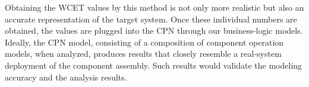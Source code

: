 Obtaining the WCET values by this method is not only more realistic but also an accurate representation of the target system. Once these individual numbers are obtained, the values are plugged into the CPN through our business-logic models. Ideally, the CPN model, consisting of a composition of component operation models, when analyzed, produces results that closely resemble a real-system deployment of the component assembly. Such results would validate the modeling accuracy and the analysis results.



